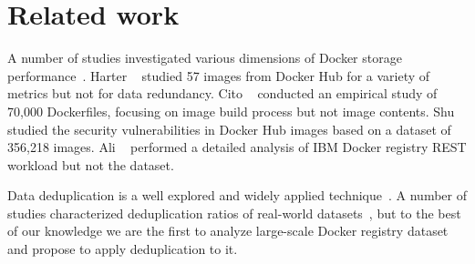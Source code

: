 \section{Related work}
\label{sec:related}


A number of studies investigated various dimensions of Docker storage
performance~\cite{dockerssd,docker-driver-eval,slacker,improve-cow-container-drivers,
exoclones,shifter}.
%
Harter \etal~\cite{slacker} studied 57 images from Docker Hub for a variety of metrics
but not for data redundancy.
%
Cito \etal~\cite{analysisdockergithub} conducted an empirical study of 70,000
Dockerfiles, focusing on image build process but not image contents.
%
Shu \etal~\cite{dockervulnerabile} studied the security vulnerabilities in Docker Hub
images based on a dataset of 356,218 images.
%
Ali \etal~\cite{dockerworkload} performed a detailed analysis
of IBM Docker registry REST workload but not the dataset.

%
%
%

Data deduplication is a well
explored and widely applied technique~\cite{2001-low_bandwidth_network_fs-sosp,
2008-avoid_disk_bottleneck_data_domain_dedupfs-fast,
2009-sparse_indexing_inline_dedup_using_sampling-fast,
tarasov2014dmdedup,2012-idedup-fast}.
%
A number of studies characterized deduplication ratios of
real-world datasets~\cite{2013-charact_dedup_effic_big_data-iiswc,
2013-charact_increment_changes_data_protect-atc,
2012-charact_backup_workloads-fast,
2012-hpc_practical_dedup_study-sc,
msst16dedup-study,
2012-data_reduction_in_primary_storage-systor,
2009-dedup_effectiveness_on_vm_disk_images-systor},
but to the best of our knowledge we are the first
to analyze large-scale Docker registry dataset and
propose to apply deduplication to it.


